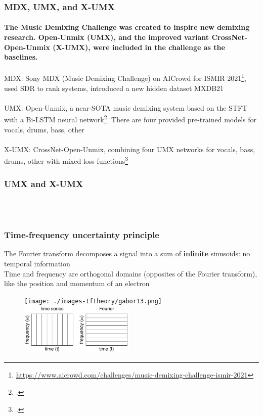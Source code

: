 \documentclass[usenames,dvipsnames]{beamer}
\begin{document}
\begin{frame}
	\frametitle{MDX, UMX, and X-UMX}
	\framesubtitle{The Music Demixing Challenge was created to inspire new demixing research. Open-Unmix (UMX), and the improved variant CrossNet-Open-Unmix (X-UMX), were included in the challenge as the baselines.}
	MDX: Sony MDX (Music Demixing Challenge) on AICrowd for ISMIR 2021\footnote{\url{https://www.aicrowd.com/challenges/music-demixing-challenge-ismir-2021}}, used SDR to rank systems, introduced a new hidden dataset MXDB21\\\ \\
	UMX: Open-Unmix, a near-SOTA music demixing system based on the STFT with a Bi-LSTM neural network\footcite{umx}. There are four provided pre-trained models for vocals, drums, bass, other\\\ \\
	X-UMX: CrossNet-Open-Unmix, combining four UMX networks for vocals, bass, drums, other with mixed loss functions\footcite{xumx}
\end{frame}

\begin{frame}
	\frametitle{UMX and X-UMX}
	\begin{figure}[ht]
		\centering
		\\
		\\
	\end{figure}
\end{frame}

\begin{frame}
	\frametitle{Time-frequency uncertainty principle}
	The Fourier transform decomposes a signal into a sum of \textbf{infinite} sinusoids: no temporal information\\
	Time and frequency are orthogonal domains (opposites of the Fourier transform), like the position and momentum of an electron
	\begin{figure}
		\texttt{[image: ./images-tftheory/gabor13.png]}
		\includegraphics[height=2.5cm]{./images-mila-presentation/gabor5.png}
	\end{figure}
\end{frame}
\end{document}

